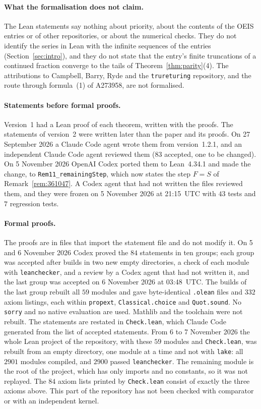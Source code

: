 \documentclass[11pt]{article}
\theoremstyle{remark}
\begin{document}
\paragraph{What the formalisation does not claim.} The Lean statements say
nothing about priority, about the contents of the OEIS entries or of other
repositories, or about the numerical checks. They do not identify the series in
Lean with the infinite sequences of the entries (Section~\ref{sec:intro}), and
they do not state that the entry's finite truncations of a continued fraction
converge to the tails of Theorem~\ref{thm:parity}(4). The attributions to
Campbell, Barry, Ryde and the \texttt{trureturing} repository, and the route
through formula~(1) of A273958, are not formalised.

\paragraph{Statements before formal proofs.} Version~1 had a Lean proof of each
theorem, written with the proofs. The statements of version~2 were written later
than the paper and its proofs. On 27 September 2026 a Claude Code agent wrote
them from version~1.2.1, and an independent Claude Code agent reviewed them
($83$ accepted, one to be changed). On 5 November 2026 OpenAI Codex ported them
to Lean~4.34.1 and made the change, to \texttt{Rem11\_remainingStep}, which now
states the step $F=S$ of Remark~\ref{rem:361047}. A Codex agent that had not
written the files reviewed them, and they were frozen on 5 November 2026 at
21:15~UTC with $43$ tests and $7$ regression tests.

\paragraph{Formal proofs.} The proofs are in files that import the statement
file and do not modify it. On 5 and 6 November 2026 Codex proved the $84$
statements in ten groups; each group was accepted after builds in two new empty
directories, a check of each module with \texttt{leanchecker}, and a review by a
Codex agent that had not written it, and the last group was accepted on
6 November 2026 at 03:48~UTC. The builds of the last group rebuilt all $59$ modules
and gave byte-identical \texttt{.olean} files and $332$ axiom listings, each within \texttt{propext},
\texttt{Classical.choice} and \texttt{Quot.sound}. No \texttt{sorry} and no native
evaluation are used. Mathlib and the toolchain were not rebuilt.
The statements are restated in \texttt{Check.lean}, which Claude Code generated from the
list of accepted statements. From 6 to 7 November 2026 the whole Lean project of the
repository, with these $59$ modules and \texttt{Check.lean}, was rebuilt from an empty
directory, one module at a time and not with \texttt{lake}: all $2901$ modules compiled, and
$2900$ passed \texttt{leanchecker}. The remaining module is the root of the project, which
has only imports and no constants, so it was not replayed. The $84$ axiom lists printed by
\texttt{Check.lean} consist of exactly the three axioms above. This part of the repository
has not been checked with comparator or with an independent kernel.
\end{document}
